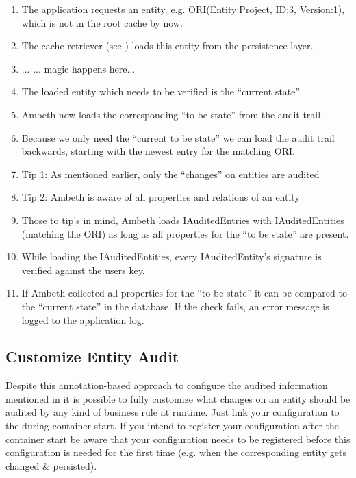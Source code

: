 \begin{enumerate}
	\item The application requests an entity. e.g. ORI(Entity:Project, ID:3, Version:1), which is not in the root cache by now.
	\item The cache retriever (see  ) loads this entity from the persistence layer.
	\item ... \TODO ... magic happens here...
	\item The loaded entity which needs to be verified is the ``current state'' 
	\item Ambeth now loads the corresponding ``to be state'' from the audit trail.
	\item Because we only need the ``current to be state'' we can load the audit trail backwards, starting with the newest entry for the matching ORI.
	\item Tip 1: As mentioned earlier, only the ``changes'' on entities are audited
	\item Tip 2: Ambeth is aware of all properties and relations of an entity
	\item Those to tip's in mind, Ambeth loads IAuditedEntries with IAuditedEntities (matching the ORI) as long as all properties for the ``to be state'' are present.
	\item While loading the IAuditedEntities, every IAuditedEntity's signature is verified against the users key.
	\item If Ambeth collected all properties for the ``to be state'' it can be compared to the ``current state'' in the database. If the check fails, an error message is logged to the application log.
\end{enumerate}

\subsection{Customize Entity Audit}
Despite this annotation-based approach to configure the audited information mentioned in  it is possible to fully customize what changes on an entity should be audited by any kind of business rule at runtime. Just link your configuration to the  during container start. If you intend to register your configuration after the container start be aware that your configuration needs to be registered before this configuration is needed for the first time (e.g. when the corresponding entity gets changed \& persisted).

